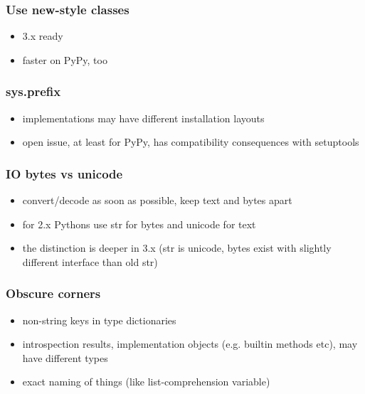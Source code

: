 \documentclass[utf8x, 14pt]{beamer}
\begin{document}
\begin{frame}
  \frametitle{Use new-style classes}
  \begin{itemize}
    \item 3.x ready
    \item faster on PyPy, too
  \end{itemize}
\end{frame}

\begin{frame}
  \frametitle{{\ttfamily sys.prefix}}
  \begin{itemize}
    \item implementations may have different installation layouts
    \item open issue, at least for PyPy, has compatibility consequences with
  setuptools
  \end{itemize}
\end{frame}

\begin{frame}
  \frametitle{IO bytes vs unicode}
  \begin{itemize}
    \item convert/decode as soon as possible, keep text and bytes apart
    \item for 2.x Pythons use str for bytes and unicode for text
    \item the distinction is deeper in 3.x (str is unicode, bytes exist with
  slightly different interface than old str)
  \end{itemize}
\end{frame}

\begin{frame}
  \frametitle{Obscure corners}
  \begin{itemize}
    \item non-string keys in type dictionaries
    \item introspection results, implementation objects (e.g. builtin methods
      etc), may have different types
    \item exact naming of things (like list-comprehension variable)
  \end{itemize}
\end{frame}
\end{document}
